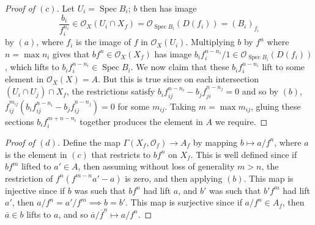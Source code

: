 \documentclass[12pt,letterpaper]{article}
\theoremstyle{definition}
\theoremstyle{remark}
\numberwithin{equation}{section}
\numberwithin{figure}{problem}
\DeclareMathOperator{\Spec}{Spec}
\newcommand{\OO}{\mathcal{O}}
\begin{document}
\begin{proof}[Proof of $(c)$]
  Let $U_i = \Spec B_i$; $b$ then has image
  \begin{equation*}
    \frac{b_i}{f_i^{n_i}} \in \OO_X(U_i \cap X_f) = \OO_{\Spec B_i}(D(f_i)) = (B_i)_{f_i}
  \end{equation*}
  by $(a)$, where $f_i$ is the image of $f$ in $\OO_X(U_i)$. Multiplying $b$ by $f^n$ where $n = \max n_i$ gives that $bf^n \in \OO_X(X_f)$ has image $b_if_i^{n-n_i}/1 \in \OO_{\Spec B_i}(D(f_i))$, which lifts to $b_if_i^{n-n_i} \in \Spec B_i$. We now claim that these $b_if_i^{n-n_i}$ lift to some element in $\OO_X(X) = A$. But this is true since on each intersection $(U_i \cap U_j) \cap X_f$, the restrictions satisfy $b_if_{ij}^{n-n_i} - b_jf_{ji}^{n-n_j} = 0$ and so by $(b)$, $f_{ij}^{m_{ij}}(b_if_{ij}^{n-n_i} - b_jf_{ij}^{n-n_j}) = 0$ for some $m_{ij}$. Taking $m = \max m_{ij}$, gluing these sections $b_if_i^{m+n-n_i}$ together produces the element in $A$ we require.
\end{proof}
\begin{proof}[Proof of $(d)$]
  Define the map $\Gamma(X_f,\OO_f) \to A_f$ by mapping $b \mapsto a/f^n$, where $a$ is the element in $(c)$ that restricts to $bf^n$ on $X_f$. This is well defined since if $bf^m$ lifted to $a' \in A$, then assuming without loss of generality $m > n$, the restriction of $f^{n}(f^{m-n}a'-a)$ is zero, and then applying $(b)$. This map is injective since if $b$ was such that $bf^n$ had lift $a$, and $b'$ was such that $b'f^m$ had lift $a'$, then $a/f^n = a'/f^m \implies b = b'$. This map is surjective since if $a/f^n \in A_f$, then $\overline{a} \in b$ lifts to $a$, and so $\overline{a}/\overline{f}^n \mapsto a/f^n$.
\end{proof}
\end{document}

